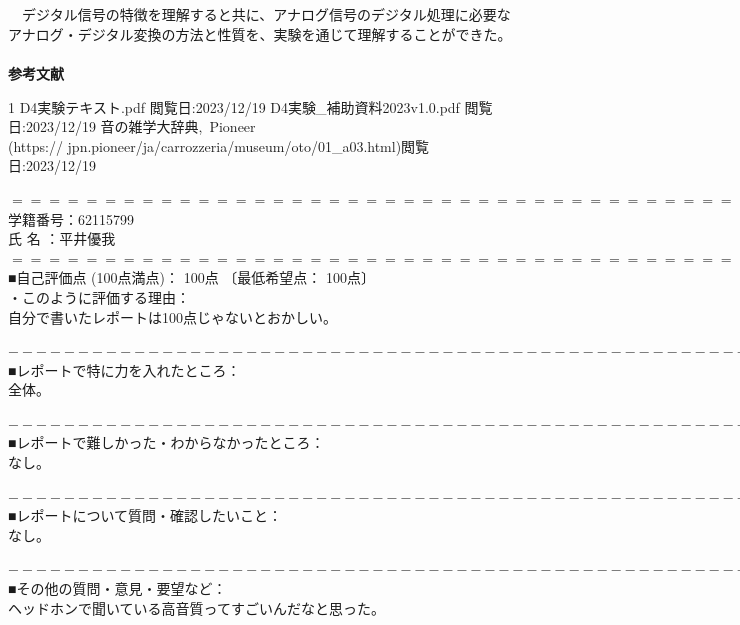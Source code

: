 \documentclass[a4paper,10.5pt]{ltjsarticle}
\begin{document}
\\
\hspace{-2pt}{\Large \bfseries 4.結論}\\
　デジタル信号の特徴を理解すると共に、アナログ信号のデジタル処理に必要なアナログ・デジタル変換の方法と性質を、実験を通じて理解することができた。\\
\\
{\Large \bfseries 参考文献}
\begin{thebibliography}{1}
\vspace{-1.5cm}
   D4実験テキスト.pdf 閲覧日:2023/12/19
   D4実験\_補助資料2023v1.0.pdf 閲覧日:2023/12/19
   音の雑学大辞典,\ Pioneer\\(https:// jpn.pioneer/ja/carrozzeria/museum/oto/01\_a03.html)閲覧日:2023/12/19
\end{thebibliography}
\clearpage
$============================================================$\\
学籍番号：62115799\\
 氏  名 ：平井優我\\
$============================================================$\\
■自己評価点 (100点満点)： 100点 〔最低希望点： 100点〕\\
・このように評価する理由：\\自分で書いたレポートは100点じゃないとおかしい。



$------------------------------------------------------------$\\
■レポートで特に力を入れたところ：\\
全体。


$------------------------------------------------------------$\\
■レポートで難しかった・わからなかったところ：\\
なし。


$------------------------------------------------------------$\\
■レポートについて質問・確認したいこと：\\
なし。


$------------------------------------------------------------$\\
■その他の質問・意見・要望など：\\
ヘッドホンで聞いている高音質ってすごいんだなと思った。
\end{document}
